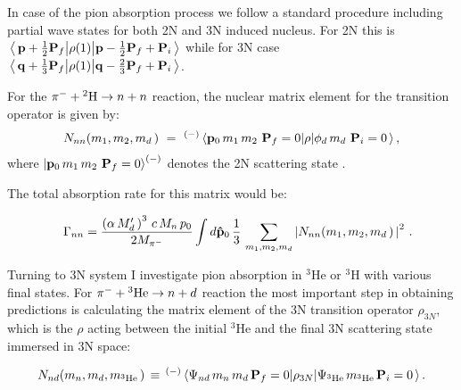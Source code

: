     In case of the pion absorption process we follow a standard procedure
    including partial wave states for both 2N and 3N induced nucleus.
    For 2N this is 
    $ \matrixel{\, {\bf p} + \frac12{\bf P}_f } 
    {\rho (1) }{ {\bf p} - \frac12{\bf P}_f + {\bf P}_i \, }$
    while for 3N case
    $\matrixel {\, {\bf q} + \frac13{\bf P}_f}  
    {\rho(1)} {{\bf q} - \frac23{\bf P}_f + {\bf P}_i \,}$.

    For the $\pi^- + {^2{\rm H}} \rightarrow n + n $ reaction,
    the nuclear matrix element for the transition operator is given by:
    \begin{eqnarray}
        N_{nn} (m_1, m_2, m_d \, ) \ = \
   ^{(-)}\matrixel{ {\bf p}_0 \, m_{1} \, m_2 \ {\bf P}_f=0 } 
   {\rho } {\phi_d \, m_d \ {\bf P}_i=0 \, },
   \label{nnn1}
   \end{eqnarray}
   where $ \ket{  {\bf p}_0 \, m_{1} \, m_2 \ {\bf P}_f=0  }^{(-)}  $ denotes the 2N scattering state \cite{Golak2018}.

   The total absorption rate for this matrix would be:

   \begin{eqnarray}
        &&\Gamma_{nn} = 
    \frac{ \left( \alpha \, M^\prime_d \, \right)^3 \, c \, M_n \, p_0 }{ 2 M_{\pi^-} }
        \int d {\bf\hat p}_0 \,
        \frac13 \, 
        \sum\limits_{m_1, m_2, m_d} 
        \left| 
        N_{nn} (m_1, m_2, m_d \, ) \, 
        \right|^2  \, .
    \label{gnn1}
    \end{eqnarray} 

    Turning to 3N system I investigate pion absorption in $^3$He or $^3$H
    with various final states.
    For $\pi^- + {^3{\rm He}} \rightarrow n + d $ reaction the most important step in 
    obtaining predictions is calculating
    the matrix element
    of the 3N transition operator $\rho_{3N}$,
     which is the $\rho$ acting between the initial $^3$He and the final 3N scattering state immersed in 3N space:

    \begin{eqnarray}  
        N_{nd} (m_n, m_d , m_{^3{\rm He}}  \, )  \, \equiv \, 
        {}^{(-)}\matrixel{\Psi_{nd}  \, 
            m_n \, m_d \,
            {\bf P}_f=0 
            } {\rho_{3N} }
        {\Psi_{^3{\rm He}} \, m_{^3{\rm He}} \, {\bf P}_i=0 \, }.
        \label{nnd}
    \end{eqnarray}

